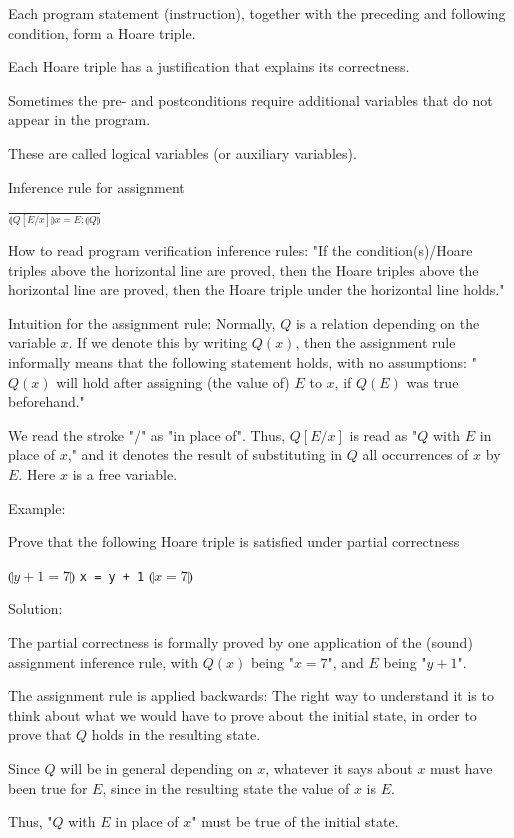 \documentclass{article}
\begin{document}
Each program statement (instruction), together with the preceding and following condition, form a Hoare triple.

Each Hoare triple has a justification that explains its correctness.

Sometimes the pre- and postconditions require additional variables that do not appear in the program.

These are called logical variables (or auxiliary variables).

Inference rule for assignment

$\frac{}{\llparenthesis Q[E/x] \rrparenthesis x = E; \llparenthesis Q \rrparenthesis}$

How to read program verification inference rules: "If the condition(s)/Hoare triples above the horizontal line are proved, then the Hoare triples above the horizontal line are proved, then the Hoare triple under the horizontal line holds."

Intuition for the assignment rule: Normally, $Q$ is a relation depending on the variable $x$. If we denote this by writing $Q(x)$, then the assignment rule informally means that the following statement holds, with no assumptions: "$Q(x)$ will hold after assigning (the value of) $E$ to $x$, if $Q(E)$ was true beforehand."

We read the stroke "$/$" as "in place of". Thus, $Q[E/x]$ is read as "$Q$ with $E$ in place of $x$," and it denotes the result of substituting in $Q$ all occurrences of $x$ by $E$. Here $x$ is a free variable.

Example: 

Prove that the following Hoare triple is satisfied under partial correctness

$\llparenthesis y + 1 = 7 \rrparenthesis$ \verb|x = y + 1| $\llparenthesis x = 7 \rrparenthesis$

Solution:

The partial correctness is formally proved by one application of the (sound) assignment inference rule, with $Q(x)$ being "$x=7$", and $E$ being "$y+1$".

The assignment rule is applied backwards: The right way to understand it is to think about what we would have to prove about the initial state, in order to prove that $Q$ holds in the resulting state.

Since $Q$ will be in general depending on $x$, whatever it says about $x$ must have been true for $E$, since in the resulting state the value of $x$ is $E$.

Thus, "$Q$ with $E$ in place of $x$" must be true of the initial state.
\end{document}
